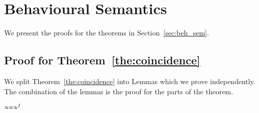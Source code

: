 \section{Behavioural Semantics}

We present the proofs for the theorems in
Section~\ref{sec:beh_sem}.

\subsection{Proof for Theorem~\ref{the:coincidence}}
\label{app:sub_coinc}

We split Theorem~\ref{the:coincidence} into 
Lemmas which we prove independently.
The combination of the lemmas is the proof for the parts
of the theorem.



\begin{lemma}\rm
	\label{lem:wb_eq_wbf}
	$\approx = \approx^{f}$
\end{lemma}


